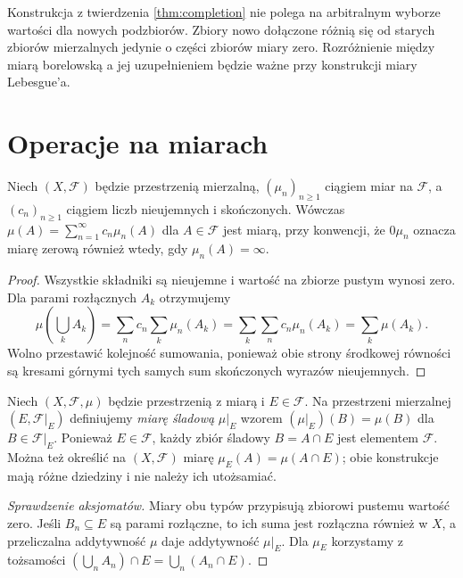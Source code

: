 \begin{uwaga}
Konstrukcja z twierdzenia \ref{thm:completion} nie polega
na arbitralnym wyborze wartości dla nowych podzbiorów.
Zbiory nowo dołączone różnią się od starych zbiorów
mierzalnych jedynie o części zbiorów miary zero.
Rozróżnienie między miarą borelowską a jej uzupełnieniem
będzie ważne przy konstrukcji miary Lebesgue'a.
\end{uwaga}

\section{Operacje na miarach}

\begin{twierdzenie}
\label{thm:measure-operations}
Niech $(X,\mathcal F)$ będzie przestrzenią mierzalną,
$(\mu_n)_{n\geq1}$ ciągiem miar na $\mathcal F$,
a $(c_n)_{n\geq1}$ ciągiem liczb nieujemnych i skończonych.
Wówczas
$\mu(A)=\sum_{n=1}^{\infty}c_n\mu_n(A)$ dla $A\in\mathcal F$
jest miarą, przy konwencji, że $0\mu_n$ oznacza miarę
zerową również wtedy, gdy $\mu_n(A)=\infty$.
\end{twierdzenie}
\begin{proof}
Wszystkie składniki są nieujemne i wartość na zbiorze pustym
wynosi zero. Dla parami rozłącznych $A_k$ otrzymujemy
\[
\mu\left(\bigcup_kA_k\right)
=\sum_n c_n\sum_k\mu_n(A_k)
=\sum_k\sum_n c_n\mu_n(A_k)
=\sum_k\mu(A_k).
\]
Wolno przestawić kolejność sumowania, ponieważ obie strony
środkowej równości są kresami górnymi tych samych sum
skończonych wyrazów nieujemnych.
\end{proof}

\begin{definicja}
\label{def:restriction}
Niech $(X,\mathcal F,\mu)$ będzie przestrzenią z miarą
i $E\in\mathcal F$. Na przestrzeni mierzalnej
$(E,\mathcal F|_E)$ definiujemy \emph{miarę śladową}
$\mu|_E$ wzorem
$(\mu|_E)(B)=\mu(B)$ dla $B\in\mathcal F|_E$.
Ponieważ $E\in\mathcal F$, każdy zbiór śladowy
$B=A\cap E$ jest elementem $\mathcal F$.
Można też określić na $(X,\mathcal F)$ miarę
$\mu_E(A)=\mu(A\cap E)$; obie konstrukcje mają
różne dziedziny i nie należy ich utożsamiać.
\end{definicja}

\begin{proof}[Sprawdzenie aksjomatów]
Miary obu typów przypisują zbiorowi pustemu wartość zero.
Jeśli $B_n\subseteq E$ są parami rozłączne, to ich
suma jest rozłączna również w $X$, a przeliczalna
addytywność $\mu$ daje addytywność $\mu|_E$.
Dla $\mu_E$ korzystamy z tożsamości
$(\bigcup_nA_n)\cap E=\bigcup_n(A_n\cap E)$.
\end{proof}

